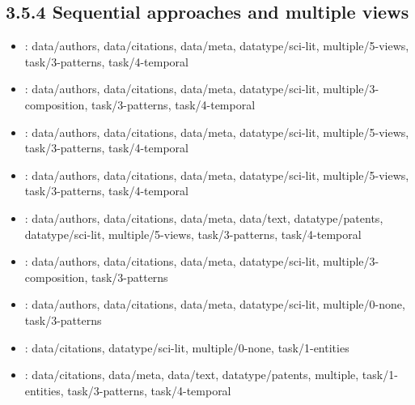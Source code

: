 \begin {refsection}
\section [3.5.4 Sequential approaches and multiple views] {3.5.4 Sequential approaches and multiple views}

\begin {itemize}
\item \cite {modjeska-1996-bivteci:-a-bibliographic-visualization-tool}:
    data/authors, data/citations, data/meta, datatype/sci-lit, multiple/5-views, task/3-patterns, task/4-temporal


\item \cite {tyman-2004-infovisexplorer}:
    data/authors, data/citations, data/meta, datatype/sci-lit, multiple/3-composition, task/3-patterns, task/4-temporal


\item \cite {elmqvist-2007-citewiz:-a-tool-for-the-visualization-of-scientific-citation}:
    data/authors, data/citations, data/meta, datatype/sci-lit, multiple/5-views, task/3-patterns, task/4-temporal


\item \cite {bergstroem-2009-augmenting-the-exploration-of-digital-libraries-with}:
    data/authors, data/citations, data/meta, datatype/sci-lit, multiple/5-views, task/3-patterns, task/4-temporal


\item \cite {morris-2002-diva:-a-visualization-system-for-exploring-document}:
    data/authors, data/citations, data/meta, data/text, datatype/patents, datatype/sci-lit, multiple/5-views, task/3-patterns, task/4-temporal


\item \cite {dork-2012-pivotpaths:-strolling-through-faceted-information}:
    data/authors, data/citations, data/meta, datatype/sci-lit, multiple/3-composition, task/3-patterns


\item \cite {erten-2004-graphael:-graph-animations-with-evolving}:
    data/authors, data/citations, data/meta, datatype/sci-lit, multiple/0-none, task/3-patterns


\item \cite {bergstroem-2006-circleview:-scalable-visualization-and-navigation-of-citation}:
    data/citations, datatype/sci-lit, multiple/0-none, task/1-entities


\item \cite {koch-2011-iterative-integration-of-visual-insights-during}:
    data/citations, data/meta, data/text, datatype/patents, multiple, task/1-entities, task/3-patterns, task/4-temporal



\end{itemize}
\end{refsection}
